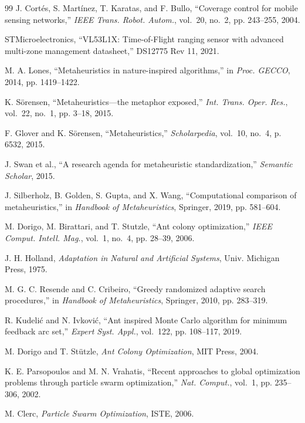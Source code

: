 \documentclass[journal,twoside]{IEEEtran}
\begin{document}
\begin{thebibliography}{99}
J. Cortés, S. Martínez, T. Karatas, and F. Bullo, ``Coverage control for mobile sensing networks,'' \emph{IEEE Trans. Robot. Autom.}, vol.~20, no.~2, pp. 243--255, 2004.

STMicroelectronics, ``VL53L1X: Time-of-Flight ranging sensor with advanced multi-zone management datasheet,'' DS12775 Rev 11, 2021.

M. A. Lones, ``Metaheuristics in nature-inspired algorithms,'' in \emph{Proc. GECCO}, 2014, pp. 1419--1422.

K. Sörensen, ``Metaheuristics—the metaphor exposed,'' \emph{Int. Trans. Oper. Res.}, vol.~22, no.~1, pp. 3--18, 2015.

F. Glover and K. Sörensen, ``Metaheuristics,'' \emph{Scholarpedia}, vol.~10, no.~4, p. 6532, 2015.

J. Swan et al., ``A research agenda for metaheuristic standardization,'' \emph{Semantic Scholar}, 2015.

J. Silberholz, B. Golden, S. Gupta, and X. Wang, ``Computational comparison of metaheuristics,'' in \emph{Handbook of Metaheuristics}, Springer, 2019, pp. 581--604.

M. Dorigo, M. Birattari, and T. Stutzle, ``Ant colony optimization,'' \emph{IEEE Comput. Intell. Mag.}, vol.~1, no.~4, pp. 28--39, 2006.

J. H. Holland, \emph{Adaptation in Natural and Artificial Systems}, Univ. Michigan Press, 1975.

M. G. C. Resende and C. Cribeiro, ``Greedy randomized adaptive search procedures,'' in \emph{Handbook of Metaheuristics}, Springer, 2010, pp. 283--319.

R. Kudelić and N. Ivković, ``Ant inspired Monte Carlo algorithm for minimum feedback arc set,'' \emph{Expert Syst. Appl.}, vol.~122, pp. 108--117, 2019.

M. Dorigo and T. Stützle, \emph{Ant Colony Optimization}, MIT Press, 2004.

K. E. Parsopoulos and M. N. Vrahatis, ``Recent approaches to global optimization problems through particle swarm optimization,'' \emph{Nat. Comput.}, vol.~1, pp. 235--306, 2002.

M. Clerc, \emph{Particle Swarm Optimization}, ISTE, 2006.


\end{thebibliography}
\end{document}
